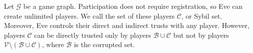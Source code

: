 {}
\begin{definition}
  Let $\mathcal{G}$ be a game graph. Participation does not require registration, so Eve can create unlimited players. We call
  the set of these players $\mathcal{C}$, or Sybil set. Moreover, Eve controls their direct and indirect trusts with any
  player. However, players $\mathcal{C}$ can be directly trusted only by players $\mathcal{B} \cup \mathcal{C}$ but not by
  players $\mathcal{V} \setminus (\mathcal{B} \cup \mathcal{C})$, where $\mathcal{B}$ is the corrupted set.
\end{definition}
